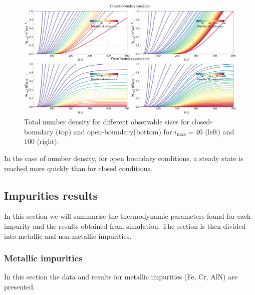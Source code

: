 \begin{figure}[H]
    \centering
    \hspace*{-2cm} %
    \includegraphics[width=1.2\linewidth]{laszlo_results/number_evolution_comparison.png}
    \caption{Total number density for different observable sizes for closed- boundary (top) and open-boundary(bottom) for $i_{\text{max}} = 40$ (left) and $100$ (right).}
    \label{fig:number_evolution_comparison}
\end{figure}

In the case of number density, for open boundary conditions, a steady state is reached more quickly than for closed conditions.

\subsection{Impurities results}
In this section we will summarise the thermodynamic parameters found for each impurity and the results obtained from simulation.
The section is then divided into metallic and non-metallic impurities. 
\subsubsection{Metallic impurities}
In this section the data and results for metallic impurities (Fe, Cr, AlN) are presented.
